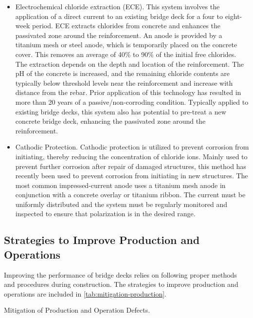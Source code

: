 \begin{itemize}
  \item Electrochemical chloride extraction (ECE). This system involves the application of a direct current to an existing bridge deck for a four to eight-week period. ECE extracts chlorides from concrete and enhances the passivated zone around the reinforcement. An anode is provided by a titanium mesh or steel anode, which is temporarily placed on the concrete cover. This removes an average of 40\% to 90\% of the initial free chlorides. The extraction depends on the depth and location of the reinforcement. The pH of the concrete is increased, and the remaining chloride contents are typically below threshold levels near the reinforcement and increase with distance from the rebar. Prior application of this technology has resulted in more than 20 years of a passive/non-corroding condition. Typically applied to existing bridge decks, this system also has potential to pre-treat a new concrete bridge deck, enhancing the passivated zone around the reinforcement.
  \item Cathodic Protection. Cathodic protection is utilized to prevent corrosion from initiating, thereby reducing the concentration of chloride ions. Mainly used to prevent further corrosion after repair of damaged structures, this method has recently been used to prevent corrosion from initiating in new structures. The most common impressed-current anode uses a titanium mesh anode in conjunction with a concrete overlay or titanium ribbon. The current must be uniformly distributed and the system must be regularly monitored and inspected to ensure that polarization is in the desired range.
\end{itemize}

\subsection{Strategies to Improve Production and Operations}
\label{subsec:strategies-improve-operation}
Improving the performance of bridge decks relies on following proper methods and procedures during construction. The strategies to improve production and operations are included in \cref{tab:mitigation-production}.

\begin{table}
  \caption{Mitigation of Production and Operation Defects.}
  \label{tab:mitigation-production}
\end{table}

